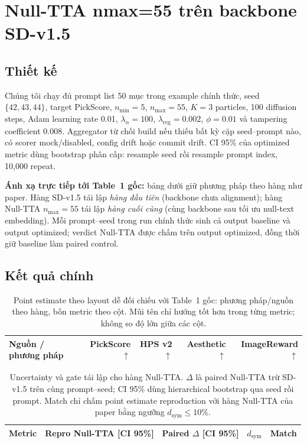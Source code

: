 \documentclass[11pt,a4paper]{article}
\begin{document}
\section{Null-TTA nmax=55 trên backbone SD-v1.5}

\subsection{Thiết kế}

Chúng tôi chạy đủ prompt list 50 mục trong example chính thức, seed $\{42,43,44\}$, target PickScore, $n_{\min}=5$, $n_{\max}=55$, $K=3$ particles, 100 diffusion steps, Adam learning rate 0.01, $\lambda_{\alpha}=100$, $\lambda_{\mathrm{reg}}=0.002$, $\phi=0.01$ và tampering coefficient 0.008. Aggregator từ chối build nếu thiếu bất kỳ cặp seed--prompt nào, có scorer mock/disabled, config drift hoặc commit drift. CI 95\% của optimized metric dùng bootstrap phân cấp: resample seed rồi resample prompt index, 10,000 repeat.

\textbf{Ánh xạ trực tiếp tới Table~1 gốc:} bảng dưới giữ phương pháp theo hàng như paper. Hàng SD-v1.5 tái lập \emph{hàng đầu tiên} (backbone chưa alignment); hàng Null-TTA $n_{\max}=55$ tái lập \emph{hàng cuối cùng} (cùng backbone sau tối ưu null-text embedding). Mỗi prompt--seed trong run chính thức sinh cả output baseline và output optimized; verdict Null-TTA được chấm trên output optimized, đồng thời giữ baseline làm paired control.

\subsection{Kết quả chính}

\begin{table}[H]
\centering
\small
\caption{Point estimate theo layout dễ đối chiếu với Table~1 gốc: phương pháp/nguồn theo hàng, bốn metric theo cột. Mũi tên chỉ hướng tốt hơn trong từng metric; không so độ lớn giữa các cột.}
\begin{tabular}{@{}lrrrr@{}}
\toprule
Nguồn / phương pháp & PickScore $\uparrow$ & HPS v2 $\uparrow$ & Aesthetic $\uparrow$ & ImageReward $\uparrow$ \\
\midrule

\end{tabular}
\end{table}

\begin{table}[H]
\centering
\footnotesize
\caption{Uncertainty và gate tái lập cho hàng Null-TTA. $\Delta$ là paired Null-TTA trừ SD-v1.5 trên cùng prompt--seed; CI 95\% dùng hierarchical bootstrap qua seed rồi prompt. Match chỉ chấm point estimate reproduction với hàng Null-TTA của paper bằng ngưỡng $d_{\mathrm{sym}}\leq10\%$.}
\begin{tabular}{@{}lrrrl@{}}
\toprule
Metric & Repro Null-TTA [CI 95\%] & Paired $\Delta$ [CI 95\%] & $d_{\mathrm{sym}}$ & Match \\
\midrule

\end{tabular}
\end{table}
\end{document}
